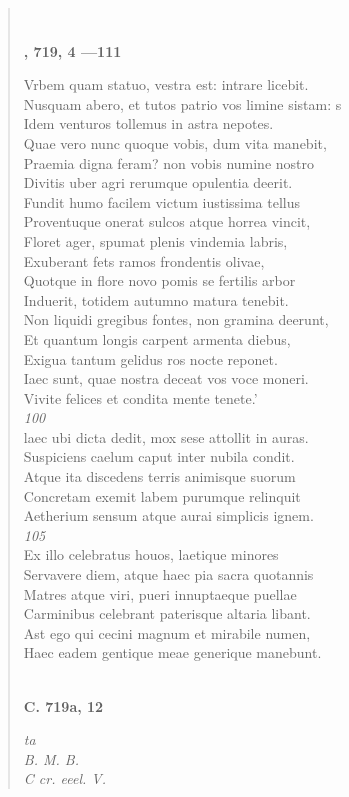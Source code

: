 \documentclass[11pt, a4paper]{report}
\begin{document}
\begin{verse}
        ﻿\pagebreak 
     \marginpar{[188]} \begin{center} \textbf{, 719, 4 —111} \end{center}Vrbem quam statuo, vestra est: intrare licebit. \\ Nusquam abero, et tutos patrio vos limine sistam: s \\ Idem venturos tollemus in astra nepotes. \\ Quae vero nunc quoque vobis, dum vita manebit, \\ Praemia digna feram? non vobis numine nostro \\ Divitis uber agri rerumque opulentia deerit. \\ Fundit humo facilem victum iustissima tellus \\ Proventuque onerat sulcos atque horrea vincit, \\ Floret ager, spumat plenis vindemia labris, \\ Exuberant fets ramos frondentis olivae, \\ Quotque in flore novo pomis se fertilis arbor \\ Induerit, totidem autumno matura tenebit. \\ Non liquidi gregibus fontes, non gramina deerunt, \\ Et quantum longis carpent armenta diebus, \\ Exigua tantum gelidus ros nocte reponet. \\ Iaec sunt, quae nostra deceat vos voce moneri. \\ Vivite felices et condita mente tenete.’ \\ \textit{100} \\ laec ubi dicta dedit, mox sese attollit in auras. \\ Suspiciens caelum caput inter nubila condit. \\ Atque ita discedens terris animisque suorum \\ Concretam exemit labem purumque relinquit \\ Aetherium sensum atque aurai simplicis ignem. \\ \textit{105} \\ Ex illo celebratus houos, laetique minores \\ Servavere diem, atque haec pia sacra quotannis \\ Matres atque viri, pueri innuptaeque puellae \\ Carminibus celebrant paterisque altaria libant. \\ Ast ego qui cecini magnum et mirabile numen, \\ Haec eadem gentique meae generique manebunt. \\ 
        ﻿\pagebreak 
    \begin{center} \textbf{C. 719a, 12} \end{center} \marginpar{[189]} \textit{ta} \\ \textit{B. M. B.} \\ \textit{C cr. eeel. V.} \\ 
      \end{verse}
  
\end{document}
